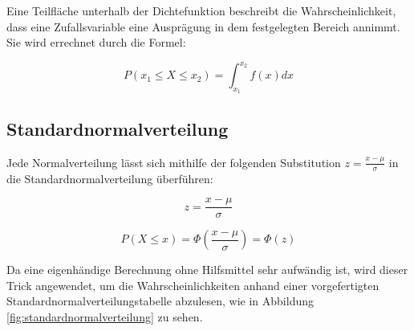 Eine Teilfläche unterhalb der Dichtefunktion beschreibt die Wahrscheinlichkeit, dass eine Zufallsvariable eine Ausprägung in dem festgelegten Bereich annimmt. Sie wird errechnet durch die Formel:

\begin{equation}
P(x_1 \le X \le x_2) = \int_{x_1}^{x_2} f(x) dx
\end{equation}

\subsection{Standardnormalverteilung}

Jede Normalverteilung lässt sich mithilfe der folgenden Substitution $z = \frac{x - \mu}{\sigma}$ in die Standardnormalverteilung überführen:

\begin{equation}
z = \frac{x - \mu}{\sigma}
\end{equation}

\begin{equation}
P(X \le x) = \Phi(\frac{x - \mu}{\sigma}) = \Phi(z)
\end{equation}

Da eine eigenhändige Berechnung ohne Hilfsmittel sehr aufwändig ist, wird dieser Trick angewendet, um die Wahrscheinlichkeiten anhand einer vorgefertigten Standardnormalverteilungstabelle abzulesen, wie in Abbildung \ref{fig:standardnormalverteilung} zu sehen.

